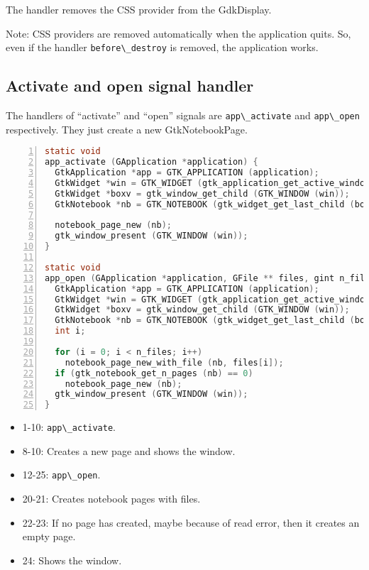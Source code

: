The handler removes the CSS provider from the GdkDisplay.

Note: CSS providers are removed automatically when the application
quits. So, even if the handler \passthrough{\lstinline!before\_destroy!}
is removed, the application works.

\subsection{Activate and open signal
handler}\label{activate-and-open-signal-handler}

The handlers of ``activate'' and ``open'' signals are
\passthrough{\lstinline!app\_activate!} and
\passthrough{\lstinline!app\_open!} respectively. They just create a new
GtkNotebookPage.

\begin{lstlisting}[language=C, numbers=left]
static void
app_activate (GApplication *application) {
  GtkApplication *app = GTK_APPLICATION (application);
  GtkWidget *win = GTK_WIDGET (gtk_application_get_active_window (app));
  GtkWidget *boxv = gtk_window_get_child (GTK_WINDOW (win));
  GtkNotebook *nb = GTK_NOTEBOOK (gtk_widget_get_last_child (boxv));

  notebook_page_new (nb);
  gtk_window_present (GTK_WINDOW (win));
}

static void
app_open (GApplication *application, GFile ** files, gint n_files, const gchar *hint) {
  GtkApplication *app = GTK_APPLICATION (application);
  GtkWidget *win = GTK_WIDGET (gtk_application_get_active_window (app));
  GtkWidget *boxv = gtk_window_get_child (GTK_WINDOW (win));
  GtkNotebook *nb = GTK_NOTEBOOK (gtk_widget_get_last_child (boxv));
  int i;

  for (i = 0; i < n_files; i++)
    notebook_page_new_with_file (nb, files[i]);
  if (gtk_notebook_get_n_pages (nb) == 0)
    notebook_page_new (nb);
  gtk_window_present (GTK_WINDOW (win));
}
\end{lstlisting}

\begin{itemize}
\tightlist
\item
  1-10: \passthrough{\lstinline!app\_activate!}.
\item
  8-10: Creates a new page and shows the window.
\item
  12-25: \passthrough{\lstinline!app\_open!}.
\item
  20-21: Creates notebook pages with files.
\item
  22-23: If no page has created, maybe because of read error, then it
  creates an empty page.
\item
  24: Shows the window.
\end{itemize}

